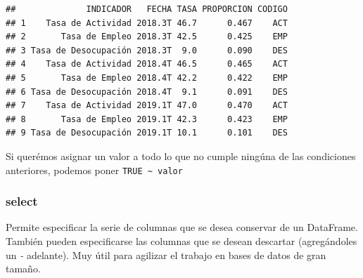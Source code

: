 \documentclass[]{book}
\newenvironment{Shaded}{\begin{snugshade}}{\end{snugshade}}
\newcommand{\DataTypeTok}[1]{\textcolor[rgb]{0.13,0.29,0.53}{#1}}
\newcommand{\KeywordTok}[1]{\textcolor[rgb]{0.13,0.29,0.53}{\textbf{#1}}}
\newcommand{\NormalTok}[1]{#1}
\newcommand{\OperatorTok}[1]{\textcolor[rgb]{0.81,0.36,0.00}{\textbf{#1}}}
\newcommand{\StringTok}[1]{\textcolor[rgb]{0.31,0.60,0.02}{#1}}
\begin{document}
\begin{Shaded}
\end{Shaded}

\begin{verbatim}
##              INDICADOR   FECHA TASA PROPORCION CODIGO
## 1    Tasa de Actividad 2018.3T 46.7      0.467    ACT
## 2       Tasa de Empleo 2018.3T 42.5      0.425    EMP
## 3 Tasa de Desocupación 2018.3T  9.0      0.090    DES
## 4    Tasa de Actividad 2018.4T 46.5      0.465    ACT
## 5       Tasa de Empleo 2018.4T 42.2      0.422    EMP
## 6 Tasa de Desocupación 2018.4T  9.1      0.091    DES
## 7    Tasa de Actividad 2019.1T 47.0      0.470    ACT
## 8       Tasa de Empleo 2019.1T 42.3      0.423    EMP
## 9 Tasa de Desocupación 2019.1T 10.1      0.101    DES
\end{verbatim}

Si querémos asignar un valor a todo lo que no cumple ningúna de las condiciones anteriores, podemos poner \texttt{TRUE\ \textasciitilde{}\ valor}

\hypertarget{select}{%
\subsubsection{select}\label{select}}

Permite especificar la serie de columnas que se desea conservar de un DataFrame. También pueden especificarse las columnas que se desean descartar (agregándoles un \emph{-} adelante). Muy útil para agilizar el trabajo en bases de datos de gran tamaño.

\begin{Shaded}
\end{Shaded}
\end{document}
